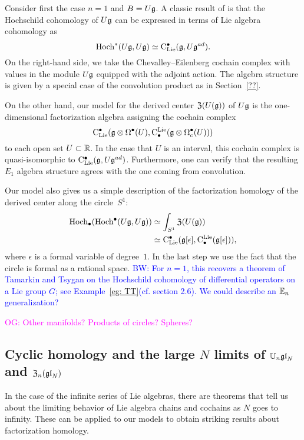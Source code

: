 \documentclass[11pt]{amsart}
\numberwithin{equation}{section}
\def\brian{\textcolor{blue}{BW: }\textcolor{blue}}
\def\owen{\textcolor{magenta}{OG: }\textcolor{magenta}}
\begin{document}
Consider first the case $n=1$ and $B = U \mathfrak g$. 
A classic result of \cite{HochSerre} is that the Hochschild cohomology of $U \mathfrak g$ can be expressed in terms of Lie algebra cohomology as 
\[
{\rm Hoch}^*(U\mathfrak g,U\mathfrak g) \simeq {\rm C}_{\rm Lie}^\bullet(\mathfrak g, U\mathfrak g^{ad}).
\] 
On the right-hand side, we take the Chevalley--Eilenberg cochain complex with values in the module $U \mathfrak g$ equipped with the adjoint action.
The algebra structure is given by a special case of the convolution product as in Section~\ref{??}. 

On the other hand, our model for the derived center ${\frak Z}(U(\mathfrak g))$ of $U \mathfrak g$ is the one-dimensional factorization algebra assigning the cochain complex
\[
{\rm C}_{\rm Lie}^\bullet(\mathfrak g \otimes \Omega^\bullet(U), {\rm C}^{\rm Lie}_\bullet( \mathfrak g \otimes \Omega^\bullet_c(U)))
\]
to each open set $U \subset \mathbb R$.
In the case that $U$ is an interval, this cochain complex is quasi-isomorphic to ${\rm C}_{\rm Lie}^\bullet (\mathfrak g , U\mathfrak g^{ad})$.
Furthermore, one can verify that the resulting $E_1$ algebra structure agrees with the one coming from convolution. 

Our model also gives us a simple description of the factorization homology of the derived center along the circle~$S^1$:
\begin{align*}
{\rm Hoch}_\bullet({\rm Hoch}^\bullet(U \mathfrak g, U\mathfrak g)) 
&\simeq \int_{S^1} {\frak Z}(U(\mathfrak g)) \\
&\simeq {\rm C}_{\rm Lie}^\bullet(\mathfrak g[\epsilon], {\rm C}^{\rm Lie}_\bullet( \mathfrak g[\epsilon])),
\end{align*}
where $\epsilon$ is a formal variable of degree~$1$. 
In the last step we use the fact that the circle is formal as a rational space.
\brian{For $n=1$, this recovers a theorem of Tamarkin and Tsygan \cite{TT} on the Hochschild cohomology of differential operators on a Lie group $G$;
see Example~\ref{eg: TT}(cf. section 2.6).
We could describe an $\mathbb E_n$ generalization?}

\owen{Other manifolds? Products of circles? Spheres?}

\subsection{Cyclic homology and the large $N$ limits of $\mathbb U_n {\mathfrak{gl}}_N$ and ${\frak Z}_n({\mathfrak{gl}}_N)$}

In the case of the infinite series of Lie algebras, 
there are theorems that tell us about the limiting behavior of Lie algebra chains and cochains as $N$ goes to infinity.
These can be applied to our models to obtain striking results about factorization homology.

\def\Dih{{\rm Dih}}
\end{document}
